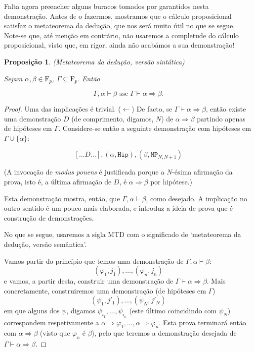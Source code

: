 \documentclass{report}
\newtheorem{prop}{Proposição}
\theoremstyle{definition}
\theoremstyle{remark}
\newcommand{\F}{\mathrm{F}}
\newcommand{\imply}{\mathbin{\Rightarrow}}
\begin{document}
	Falta agora preencher alguns buracos tomados por garantidos nesta demonstração. Antes de o fazermos, mostramos que o cálculo proposicional satisfaz o metateorema da dedução, que nos será muito útil no que se segue. Note-se que, até menção em contrário, não usaremos a completude do cálculo proposicional, visto que, em rigor, ainda não acabámos a sua demonstração!
	
	\begin{prop}
	(Metateorema da dedução, versão sintática)
	
	Sejam $\alpha, \beta \in \F_p$, $\Gamma \subseteq \F_p$. Então
	
	\[\Gamma, \alpha \vdash \beta \text{ sse } \Gamma \vdash \alpha \imply \beta.\]
	\end{prop}
	\begin{proof}
	Uma das implicações é trivial. ($\leftarrow$) De facto, se $\Gamma \vdash \alpha \imply \beta$, então existe uma demonstração $D$ (de comprimento, digamos, $N$) de $\alpha \imply \beta$ partindo apenas de hipóteses em $\Gamma$. Considere-se então a seguinte demonstração com hipóteses em $\Gamma \cup \{\alpha\}$:
	
	\[[\dots D \dots], (\alpha, \texttt{Hip}), (\beta, \texttt{MP}_{N, N+1})\]
	
	(A invocação de \textit{modus ponens} é justificada porque a $N$-ésima afirmação da prova, isto é, a última afirmação de $D$, é $\alpha \imply \beta$ por hipótese.)
	
	Esta demonstração mostra, então, que $\Gamma, \alpha \vdash \beta$, como desejado.
	\smallskip
	A implicação no outro sentido é um pouco mais elaborada, e introduz a ideia de prova que é construção de demonstrações.
	
	No que se segue, usaremos a sigla MTD com o significado de `metateorema da dedução, versão semântica'.
	
	Vamos partir do princípio que temos uma demonstração de $\Gamma, \alpha \vdash \beta$:
	\[(\varphi_1, j_1), \dots, (\varphi_n, j_n)\]
	e vamos, a partir desta, construir uma demonstração de $\Gamma \vdash \alpha \imply \beta$. Mais concretamente, construiremos uma demonstração (de hipóteses em $\Gamma$)
	\[(\psi_1, j'_1), \dots, (\psi_N, j'_N)\]
	em que alguns dos $\psi$, digamos $\psi_{i_1}, \dots, \psi_{i_n}$ (este último coincidindo com $\psi_N$) correspondem respetivamente a $\alpha \imply \varphi_1, \dots, \alpha \imply \varphi_n$. Esta prova terminará então com $\alpha \imply \beta$ (visto que $\varphi_n$ é $\beta$), pelo que teremos a demonstração desejada de $\Gamma \vdash \alpha \imply \beta$.
	

\end{proof}
\end{document}
